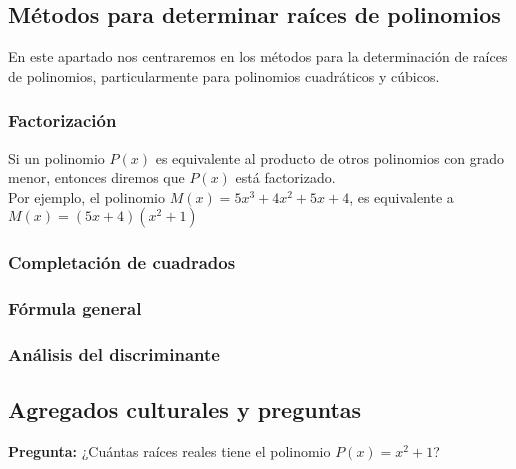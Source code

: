 \subsection{Métodos para determinar raíces de polinomios}
{
    En este apartado nos centraremos en los métodos para la determinación de raíces de polinomios, particularmente para polinomios cuadráticos y cúbicos.

    \subsubsection{Factorización}
    {
        Si un polinomio $P(x)$ es equivalente al producto de otros polinomios con grado menor, entonces diremos que $P(x)$ está factorizado.\\
        Por ejemplo, el polinomio $M(x) = 5x^3 + 4x^2 + 5x + 4$, es equivalente a $M(x) = (5x+4)(x^2 + 1)$\\


    }

    \subsubsection{Completación de cuadrados}
    {
    }

    \subsubsection{Fórmula general}
    {
    }

    \subsubsection{Análisis del discriminante}
    {
    }
}
\label{subsec:determinar-raices}

\subsection{Agregados culturales y preguntas}
{
    \textbf{Pregunta:} ¿Cuántas raíces reales tiene el polinomio $P(x) = x^2+1$?

}\label{subsec:agregados-culturales}
